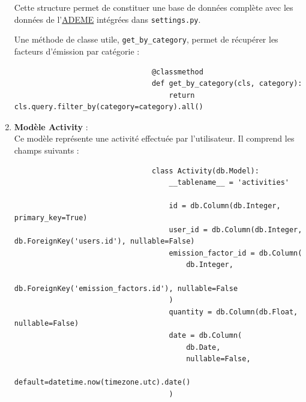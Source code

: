\documentclass[a4paper,11pt]{article}
\begin{document}
\begin{enumerate}
                        \noindent Cette structure permet de constituer une base de données complète avec les données de l'\href{https://www.ademe.fr/}{ADEME} intégrées dans \texttt{settings.py}.

                        \noindent Une méthode de classe utile, \texttt{get\_by\_category}, permet de récupérer les facteurs d'émission par catégorie :

                        \begin{tcolorbox}[colback=lightgray!6, colframe=black, left=-45mm, right=5mm, top=2mm, bottom=0mm, boxrule=0.1mm]
                            \begin{verbatim}
                                @classmethod
                                def get_by_category(cls, category):
                                    return cls.query.filter_by(category=category).all()
                            \end{verbatim}
                        \end{tcolorbox}

                    \item \textbf{Modèle Activity} :\\
                        Ce modèle représente une activité effectuée par l'utilisateur. Il comprend les champs suivants :

                        \begin{tcolorbox}[colback=lightgray!6, colframe=black, left=-55mm, right=5mm, top=2mm, bottom=0mm, boxrule=0.1mm]
                            \begin{verbatim}
                                class Activity(db.Model):
                                    __tablename__ = 'activities'
                                    
                                    id = db.Column(db.Integer, primary_key=True)
                                    user_id = db.Column(db.Integer, db.ForeignKey('users.id'), nullable=False)
                                    emission_factor_id = db.Column(
                                        db.Integer, 
                                        db.ForeignKey('emission_factors.id'), nullable=False
                                    )
                                    quantity = db.Column(db.Float, nullable=False)
                                    date = db.Column(
                                        db.Date, 
                                        nullable=False, 
                                        default=datetime.now(timezone.utc).date()
                                    )
                            \end{verbatim}
                        \end{tcolorbox}


\end{enumerate}
\end{document}
